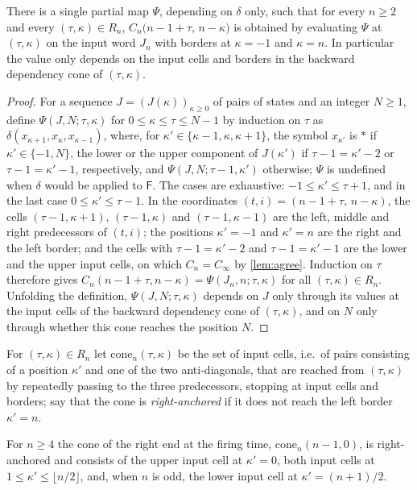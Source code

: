 \begin{lemma}[determinacy]\label{lem:determinacy}
There is a single partial map $\Psi$, depending on $\delta$ only, such that
for every $n\ge2$ and every $(\tau,\kappa)\in R_n$,
$C_n\bigl(n-1+\tau,\,n-\kappa\bigr)$ is obtained by evaluating $\Psi$ at
$(\tau,\kappa)$ on the input word $J_n$ with borders at $\kappa=-1$ and
$\kappa=n$. In particular the value only depends on the input cells and
borders in the backward dependency cone of $(\tau,\kappa)$.
\end{lemma}

\begin{proof}
For a sequence $J=(J(\kappa))_{\kappa\ge0}$ of pairs of states and an
integer $N\ge1$, define $\Psi(J,N;\tau,\kappa)$ for $0\le\kappa\le\tau\le N-1$
by induction on $\tau$ as $\delta(x_{\kappa+1},x_\kappa,x_{\kappa-1})$,
where, for $\kappa'\in\{\kappa-1,\kappa,\kappa+1\}$, the symbol $x_{\kappa'}$
is $\ast$ if $\kappa'\in\{-1,N\}$, the lower or the upper component of
$J(\kappa')$ if $\tau-1=\kappa'-2$ or $\tau-1=\kappa'-1$, respectively, and
$\Psi(J,N;\tau-1,\kappa')$ otherwise; $\Psi$ is undefined when $\delta$
would be applied to $\mathsf F$. The cases are exhaustive: $-1\le\kappa'\le
\tau+1$, and in the last case $0\le\kappa'\le\tau-1$. In the coordinates
$(t,i)=(n-1+\tau,\,n-\kappa)$, the cells $(\tau-1,\kappa+1)$,
$(\tau-1,\kappa)$ and $(\tau-1,\kappa-1)$ are the left, middle and right
predecessors of $(t,i)$; the positions $\kappa'=-1$ and $\kappa'=n$ are the
right and the left border; and the cells with $\tau-1=\kappa'-2$ and
$\tau-1=\kappa'-1$ are the lower and the upper input cells, on which
$C_n=C_\infty$ by \cref{lem:agree}. Induction on $\tau$ therefore gives
$C_n(n-1+\tau,n-\kappa)=\Psi(J_n,n;\tau,\kappa)$ for all
$(\tau,\kappa)\in R_n$. Unfolding the definition, $\Psi(J,N;\tau,\kappa)$
depends on $J$ only through its values at the input cells of the backward
dependency cone of $(\tau,\kappa)$, and on $N$ only through whether this
cone reaches the position $N$.
\end{proof}

For $(\tau,\kappa)\in R_n$ let $\mathrm{cone}_n(\tau,\kappa)$ be the set
of input cells, i.e.\ of pairs consisting of a position $\kappa'$ and one of
the two anti-diagonals, that are reached from
$(\tau,\kappa)$ by repeatedly passing to the three predecessors, stopping at
input cells and borders; say that the cone is \emph{right-anchored} if it
does not reach the left border $\kappa'=n$.

\begin{lemma}\label{lem:cone}
For $n\ge4$ the cone of the right end at the firing time,
$\mathrm{cone}_n(n-1,0)$, is right-anchored and consists of the upper input
cell at $\kappa'=0$, both input cells at $1\le\kappa'\le\lfloor n/2\rfloor$,
and, when $n$ is odd, the lower input cell at $\kappa'=(n+1)/2$.
\end{lemma}

